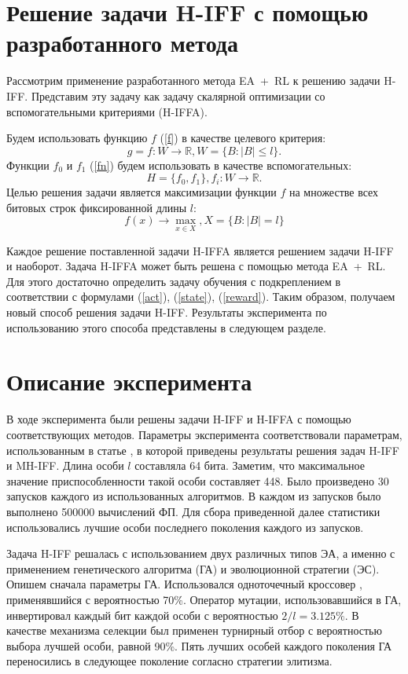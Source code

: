 \section{Решение задачи H-IFF с помощью разработанного метода}

Рассмотрим применение разработанного метода EA~+~RL к решению задачи H-IFF. Представим эту задачу как задачу скалярной оптимизации со вспомогательными критериями (H-IFFA).

Будем использовать функцию $f$ (\ref{f}) в качестве целевого критерия: 
$$g = f: W \rightarrow \mathbb{R}, W = \{B: |B| \leq l\}.$$ 
Функции $f_0$ и $f_1$ (\ref{fn}) будем использовать в качестве вспомогательных:
$$H = \{f_0, f_1\},  f_i : W \rightarrow \mathbb{R}.$$ 
Целью решения задачи является максимизации функции $f$ на множестве всех битовых строк фиксированной длины $l$: 
$$f(x) \rightarrow \max_{x \in X}, X =\{B: |B| = l\}$$

Каждое решение поставленной задачи H-IFFA является решением задачи H-IFF и наоборот. Задача H-IFFA может быть решена с помощью метода EA~+~RL. Для этого достаточно определить задачу обучения с подкреплением в соответствии с формулами (\ref{act}), (\ref{state}), (\ref{reward}). Таким образом, получаем новый способ решения задачи H-IFF. Результаты эксперимента по использованию этого способа представлены в следующем разделе. 

\section{Описание эксперимента}

В ходе эксперимента были решены задачи H-IFF и H-IFFA с помощью соответствующих методов. Параметры эксперимента соответствовали параметрам, использованным в статье \cite{mh-iff}, в которой приведены результаты решения задач H-IFF и MH-IFF. Длина особи $l$ составляла 64 бита. Заметим, что максимальное значение приспособленности такой особи составляет 448. Было произведено 30 запусков каждого из использованных алгоритмов. В каждом из запусков было выполнено 500000 вычислений ФП. Для сбора приведенной далее статистики использовались лучшие особи последнего поколения каждого из запусков. 

Задача H-IFF решалась с использованием двух различных типов ЭА, а именно с применением генетического алгоритма (ГА) и эволюционной стратегии (ЭС). Опишем сначала параметры ГА. Использовался одноточечный кроссовер \cite{mitchell-ga}, применявшийся с вероятностью 70\%. Оператор мутации, использовавшийся в ГА, инвертировал каждый бит каждой особи с вероятностью $2 / l = 3.125\%$. В качестве механизма селекции был применен турнирный отбор с вероятностью выбора лучшей особи, равной 90\%. Пять лучших особей каждого поколения ГА переносились в следующее поколение согласно стратегии элитизма. 

